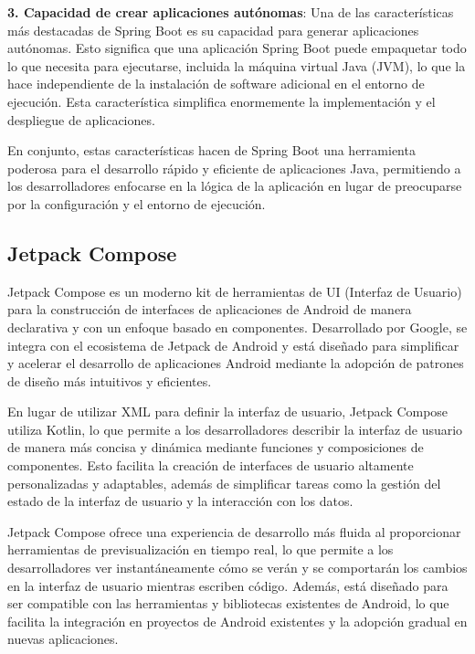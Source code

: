 \documentclass[12pt,twoside,titlepage]{report}
\begin{document}
\textbf{3. Capacidad de crear aplicaciones autónomas}: Una de las características más destacadas de Spring Boot es su capacidad para generar aplicaciones autónomas. Esto significa que una aplicación Spring Boot puede empaquetar todo lo que necesita para ejecutarse, incluida la máquina virtual Java (JVM), lo que la hace independiente de la instalación de software adicional en el entorno de ejecución. Esta característica simplifica enormemente la implementación y el despliegue de aplicaciones.

En conjunto, estas características hacen de Spring Boot una herramienta poderosa para el desarrollo rápido y eficiente de aplicaciones Java, permitiendo a los desarrolladores enfocarse en la lógica de la aplicación en lugar de preocuparse por la configuración y el entorno de ejecución.


\subsection{Jetpack Compose}
\label{sec:Jetpack Compose}

Jetpack Compose es un moderno kit de herramientas de UI (Interfaz de Usuario) para la construcción de interfaces de aplicaciones de Android de manera declarativa y con un enfoque basado en componentes. Desarrollado por Google, se integra con el ecosistema de Jetpack de Android y está diseñado para simplificar y acelerar el desarrollo de aplicaciones Android mediante la adopción de patrones de diseño más intuitivos y eficientes.

En lugar de utilizar XML para definir la interfaz de usuario, Jetpack Compose utiliza Kotlin, lo que permite a los desarrolladores describir la interfaz de usuario de manera más concisa y dinámica mediante funciones y composiciones de componentes. Esto facilita la creación de interfaces de usuario altamente personalizadas y adaptables, además de simplificar tareas como la gestión del estado de la interfaz de usuario y la interacción con los datos.

Jetpack Compose ofrece una experiencia de desarrollo más fluida al proporcionar herramientas de previsualización en tiempo real, lo que permite a los desarrolladores ver instantáneamente cómo se verán y se comportarán los cambios en la interfaz de usuario mientras escriben código. Además, está diseñado para ser compatible con las herramientas y bibliotecas existentes de Android, lo que facilita la integración en proyectos de Android existentes y la adopción gradual en nuevas aplicaciones.
\end{document}

